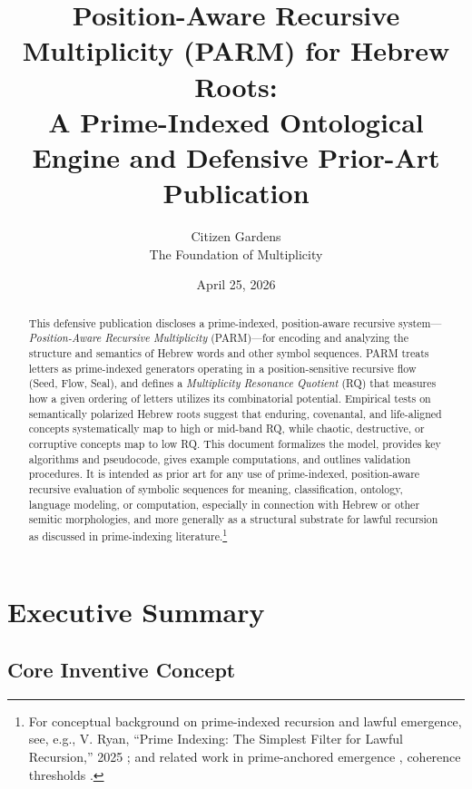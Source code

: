 \documentclass[11pt]{article}
\title{Position-Aware Recursive Multiplicity (PARM) for Hebrew Roots:\\
A Prime-Indexed Ontological Engine and Defensive Prior-Art Publication}
\author{Citizen Gardens \\ The Foundation of Multiplicity}
\date{April 25, 2026}
\begin{document}
\maketitle

\begin{abstract}
This defensive publication discloses a prime-indexed, position-aware recursive system---\emph{Position-Aware Recursive Multiplicity} (PARM)---for encoding and analyzing the structure and semantics of Hebrew words and other symbol sequences. PARM treats letters as prime-indexed generators operating in a position-sensitive recursive flow (Seed, Flow, Seal), and defines a \emph{Multiplicity Resonance Quotient} (RQ) that measures how a given ordering of letters utilizes its combinatorial potential. Empirical tests on semantically polarized Hebrew roots suggest that enduring, covenantal, and life-aligned concepts systematically map to high or mid-band RQ, while chaotic, destructive, or corruptive concepts map to low RQ. This document formalizes the model, provides key algorithms and pseudocode, gives example computations, and outlines validation procedures. It is intended as prior art for any use of prime-indexed, position-aware recursive evaluation of symbolic sequences for meaning, classification, ontology, language modeling, or computation, especially in connection with Hebrew or other semitic morphologies, and more generally as a structural substrate for lawful recursion as discussed in prime-indexing literature.\footnote{For conceptual background on prime-indexed recursion and lawful emergence, see, e.g., V. Ryan, ``Prime Indexing: The Simplest Filter for Lawful Recursion,'' 2025 \cite{primeindexing}; and related work in prime-anchored emergence \cite{primeanchor}, coherence thresholds \cite{thresholdrecursion}.}
\end{abstract}

\tableofcontents

\section{Executive Summary}

\subsection{Core Inventive Concept}
\end{document}
